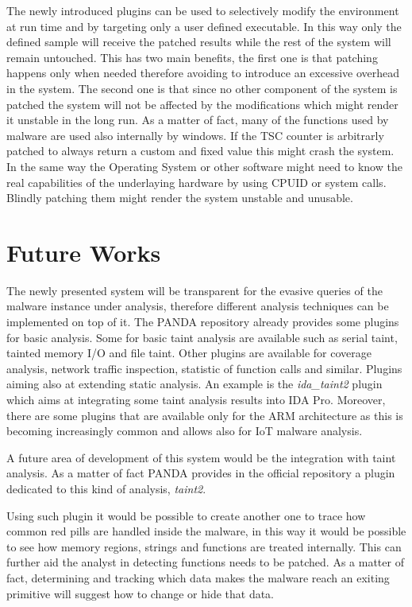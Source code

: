 The newly introduced plugins can be used to selectively modify the environment at run time and by targeting only a user defined executable. In this way only the defined sample will receive the patched results while the rest of the system will remain untouched. This has two main benefits, the first one is that patching happens only when needed therefore avoiding to introduce an excessive overhead in the system. The second one is that since no other component of the system is patched the system will not be affected by the modifications which might render it unstable in the long run. As a matter of fact, many of the functions used by malware are used also internally by windows. If the TSC counter is arbitrarly patched to always return a custom and fixed value this might crash the system. In the same way the Operating System or other software might need to know the real capabilities of the underlaying hardware by using CPUID or system calls. Blindly patching them might render the system unstable and unusable. 


\section{Future Works}

The newly presented system will be transparent for the evasive queries of the malware instance under analysis, therefore different analysis techniques can be implemented on top of it. The PANDA repository already provides some plugins for basic analysis. Some for basic taint analysis are available such as serial taint, tainted memory I/O and file taint. Other plugins are available for coverage analysis, network traffic inspection, statistic of function calls and similar. Plugins aiming also at extending static analysis. An example is the \textit{ida\_taint2} plugin which aims at integrating some taint analysis results into IDA Pro. Moreover, there are some plugins that are available only for the ARM architecture as this is becoming increasingly common and allows also for IoT malware analysis. 

A future area of development of this system would be the integration with taint analysis. As a matter of fact PANDA provides in the official repository a plugin dedicated to this kind of analysis, \textit{taint2}. 

Using such plugin it would be possible to create another one to trace how common red pills are handled inside the malware, in this way it would be possible to see how memory regions, strings and functions are treated internally. This can further aid the analyst in detecting functions needs to be patched. As a matter of fact, determining and tracking which data makes the malware reach an exiting primitive will suggest how to change or hide that data. 

